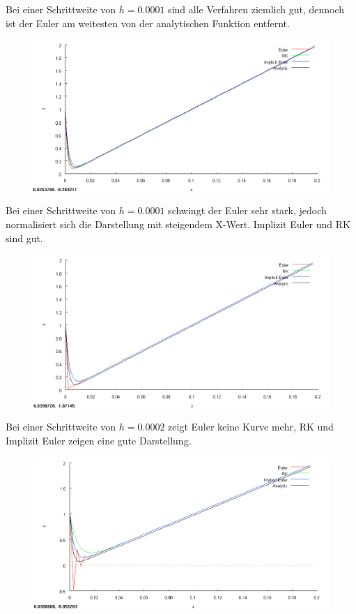 \documentclass[10pt,a4paper]{article}
\begin{document}
Bei einer Schrittweite von $h = 0.0001$ sind alle Verfahren ziemlich gut, dennoch ist der Euler am weitesten von der analytischen Funktion entfernt.
\begin{figure}[H]
\centering
\includegraphics[width=0.9\linewidth]{../screenshots/stiff 0001.png}
\end{figure}
Bei einer Schrittweite von $h = 0.0001$ schwingt der Euler sehr stark, jedoch normalisiert sich die Darstellung mit steigendem X-Wert. Implizit Euler und RK sind gut.
\begin{figure}[H]
\centering
\includegraphics[width=0.9\linewidth]{../screenshots/stiff 0002.png}
\end{figure}
Bei einer Schrittweite von $h = 0.0002$ zeigt Euler keine Kurve mehr, RK und Implizit Euler zeigen eine gute Darstellung.
\begin{figure}[H]
\centering
\includegraphics[width=0.9\linewidth]{../screenshots/stiff 0003.png}
\end{figure}
\end{document}
